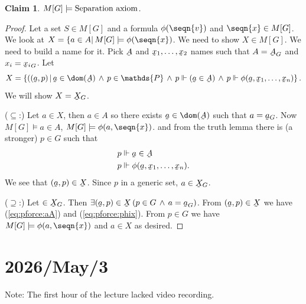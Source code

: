 \documentclass[11pt,pdftex,twoside,a4paper]{article}
\newcommand{\dsP}{\ensuremath{\mathds{P}}}
\newcommand{\forces}{\ensuremath{\Vdash}}
\newcommand{\utilde}[1]{\ensuremath{\underaccent{\tilde}{#1}}}
\newtheorem{claim}[thm]{Claim}
\theoremstyle{definition}
\begin{document}
\begin{claim}
\(M[G]\models \textnormal{Separation axiom}\).
\end{claim}
\begin{proof}
Let a set \(S\in M[G]\) and a formula \(\phi(\seqn{v})\)
and \(\seqn{x}\in M[G]\).
We look at \(X=\{a\in A|\,M[G]\models \phi(\seqn{x})\).
We need to show \(X\in M[G]\).
We need to build a name for it.
Pick \(\utilde{A}\) and
\(\utilde{x}_1,\ldots,\utilde{x}_2\)
names such that \(A={\utilde{A}}_G\) and \(x_i={\utilde{x}_i}_G\).
Let
\begin{equation*}
X = \left\{((\utilde{a},p)\,|\, \utilde{a}\in\dom(\utilde{A})\,\wedge\,
  p\in\dsP \,\wedge\,
  p\forces(\utilde{a}\in\utilde{A}) \,\wedge\,
  p\forces \phi(\utilde{a},\utilde{x}_1,\ldots,\utilde{x}_n)
  \right\}.
\end{equation*}
We will show \(X=\utilde{X}_G\).

(\(\subseteq\):) Let \(a\in X\), then \(a\in A\) so there exists
\(\utilde{a}\in\dom(\utilde{A})\) such that \(a=\utilde{a}_G\).
Now \(M[G]\models a\in A\), \(M[G] \models \phi(a,\seqn{x})\).
and from the truth lemma there is (a stronger) \(p\in G\) such that
\begin{align}
p &\forces \utilde{a} \in \utilde{A} \label{eq:pforce:aA} \\
p &\forces \phi(\utilde{a},\utilde{x}_1,\ldots,\utilde{x}_n).
  \label{eq:pforce:phix}
\end{align}
We see that \((\utilde{a},p)\in \utilde{X}\).
Since $p$ in a generic set, \(a\in \utilde{X}_G\).

(\(\supseteq\):) Let \(\in \utilde{X}_G\).
Then \(\exists (\utilde{a},p)\in\utilde{X}\,
  (p\in G\,\land\,a={\utilde{a}}_G)\).
From \((\utilde{a},p)\in\utilde{X}\)
we have (\ref{eq:pforce:aA}) and (\ref{eq:pforce:phix}).
From \(p\in G\) we have \(M[G] \models \phi(a,\seqn{x})\)
and \(a\in X\) as desired.
\end{proof}

\section{2026/May/3}

Note: The first hour of the lecture lacked video recording.

\end{document}
